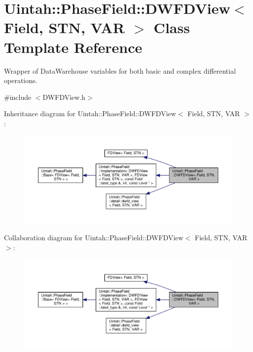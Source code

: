 \hypertarget{classUintah_1_1PhaseField_1_1DWFDView}{}\section{Uintah\+:\+:Phase\+Field\+:\+:D\+W\+F\+D\+View$<$ Field, S\+TN, V\+AR $>$ Class Template Reference}
\label{classUintah_1_1PhaseField_1_1DWFDView}


Wrapper of Data\+Warehouse variables for both basic and complex differential operations.  




{\ttfamily \#include $<$D\+W\+F\+D\+View.\+h$>$}



Inheritance diagram for Uintah\+:\+:Phase\+Field\+:\+:D\+W\+F\+D\+View$<$ Field, S\+TN, V\+AR $>$\+:\nopagebreak
\begin{figure}[H]
\begin{center}
\leavevmode
\includegraphics[width=350pt]{classUintah_1_1PhaseField_1_1DWFDView__inherit__graph}
\end{center}
\end{figure}


Collaboration diagram for Uintah\+:\+:Phase\+Field\+:\+:D\+W\+F\+D\+View$<$ Field, S\+TN, V\+AR $>$\+:\nopagebreak
\begin{figure}[H]
\begin{center}
\leavevmode
\includegraphics[width=350pt]{classUintah_1_1PhaseField_1_1DWFDView__coll__graph}
\end{center}
\end{figure}
